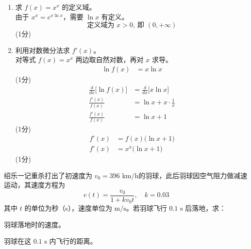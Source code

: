\documentclass[12pt,a4paper]{exam-zh}
\newcommand{\qscoreoffset}{4em}
\newcommand{\qscore}[1]{%
    \leavevmode\unskip\nobreak\hfill
    \makebox[0pt][l]{\makebox[\qscoreoffset][r]{(#1\%)}}%
}
\begin{document}
\begin{solution}
    \begin{enumerate}[label=(\alph*)]
        \item 求 $f(x) = x^x$ 的定义域。 \\
        由于 $x^x = e^{x\ln x}$，需要 $\ln x$ 有定义。
        \[
            \text{定义域为 } x > 0, \ \text{即 } (0, +\infty)
        \]
        \hfill (1分)

        \item 利用对数微分法求 $f'(x)$。 \\
        对等式 $f(x) = x^x$ 两边取自然对数，再对 $x$ 求导。
        \begin{align*}
            \ln f(x) &= x \ln x
        \end{align*}
        \hfill (1分)
        \begin{align*}
            \frac{d}{dx}\big[\ln f(x)\big] &= \frac{d}{dx}\big[x \ln x\big] \\
            \frac{f'(x)}{f(x)} &= \ln x + x \cdot \frac{1}{x} \\
            \frac{f'(x)}{f(x)} &= \ln x + 1
        \end{align*}
        \hfill (1分)
        \begin{align*}
            f'(x) &= f(x)\big(\ln x + 1\big) \\
            f'(x) &= x^x\big(\ln x + 1\big)
        \end{align*}
        \hfill (1分)
    \end{enumerate}
\end{solution}

\begin{question}[points = 4]
    绍乐一记重杀打出了初速度为 $v_0 = 396\text{ km/h}$的羽球，此后羽球因空气阻力做减速运动，其速度方程为
    \[
        v(t) = \frac{v_0}{1 + kv_0t}, \quad k = 0.03
    \]
    其中 $t$ 的单位为秒（s），速度单位为 $\text{m/s}$。若羽球飞行 $0.1\text{ s}$ 后落地，求：

    \begin{questionparts}
        \item 羽球落地时的速度。 \qscore{1}

        \item 羽球在这 $0.1\text{ s}$ 内飞行的距离。 \qscore{3}
    \end{questionparts}
\end{question}
\end{document}
